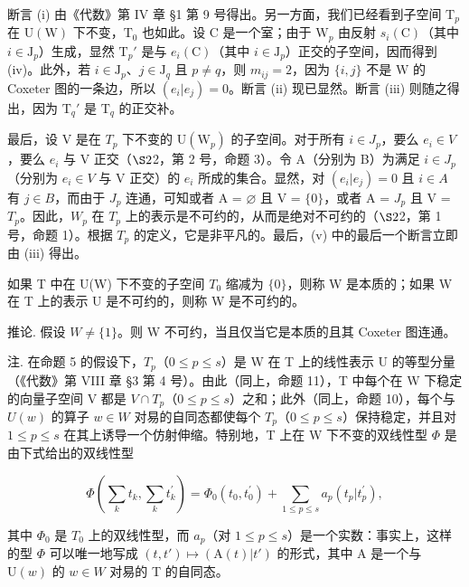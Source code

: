 断言 (i) 由《代数》第 IV 章 §1 第 9 号得出。另一方面，我们已经看到子空间 \(\mathrm{T}_p\) 在 \(\mathrm{U}(\mathrm{W})\) 下不变，\(\mathrm{T}_0\) 也如此。设 \(\mathrm{C}\) 是一个室；由于 \(\mathrm{W}_p\) 由反射 \(s_i(\mathrm{C})\)（其中 \(i \in \mathrm{J}_p\)）生成，显然 \(\mathrm{T}_p'\) 是与 \(e_i(\mathrm{C})\)（其中 \(i \in \mathrm{J}_p\)）正交的子空间，因而得到 (iv)。此外，若 \(i \in \mathrm{J}_p\)、\(j \in \mathrm{J}_q\) 且 \(p \neq q\)，则 \(m_{ij} = 2\)，因为 \(\{i,j\}\) 不是 \(\mathrm{W}\) 的 Coxeter 图的一条边，所以 \((e_i|e_j) = 0\)。断言 (ii) 现已显然。断言 (iii) 则随之得出，因为 \(\mathrm{T}_q'\) 是 \(\mathrm{T}_q\) 的正交补。

最后，设 V 是在 \(T_{p}\) 下不变的 \(\mathrm{U}(\mathrm{W}_{p})\) 的子空间。对于所有 \(i \in J_{p}\)，要么 \(e_{i} \in V\)，要么 \(e_{i}\) 与 V 正交（\(\S2\)2，第 2 号，命题 3）。令 A（分别为 B）为满足 \(i \in J_{p}\)（分别为 \(e_{i} \in V\) 与 V 正交）的 \(e_{i}\) 所成的集合。显然，对 \((e_{i}|e_{j}) = 0\) 且 \(i \in A\) 有 \(j \in B\)，而由于 \(J_{p}\) 连通，可知或者 A = \(\varnothing\) 且 V = \(\{0\}\)，或者 A = \(J_{p}\) 且 V = \(T_{p}\)。因此，\(W_{p}\) 在 \(T_{p}\) 上的表示是不可约的，从而是绝对不可约的（\(\S2\)2，第 1 号，命题 1）。根据 \(T_{p}\) 的定义，它是非平凡的。最后，(v) 中的最后一个断言立即由 (iii) 得出。

如果 T 中在 U(W) 下不变的子空间 \(T_{0}\) 缩减为 \(\{0\}\)，则称 W 是本质的；如果 W 在 T 上的表示 U 是不可约的，则称 W 是不可约的。

推论. 假设 \(W \neq \{1\}\)。则 W 不可约，当且仅当它是本质的且其 Coxeter 图连通。

注. 在命题 5 的假设下，\(T_{p}\)（\(0 \leqslant p \leqslant s\)）是 W 在 T 上的线性表示 U 的等型分量（《代数》第 VIII 章 §3 第 4 号）。由此（同上，命题 11），T 中每个在 W 下稳定的向量子空间 V 都是 \(V \cap T_{p}\)（\(0 \leqslant p \leqslant s\)）之和；此外（同上，命题 10），每个与 \(U(w)\) 的算子 \(w \in W\) 对易的自同态都使每个 \(T_{p}\)（\(0 \leqslant p \leqslant s\)）保持稳定，并且对 \(1 \leqslant p \leqslant s\) 在其上诱导一个仿射伸缩。特别地，T 上在 W 下不变的双线性型 \(\Phi\) 是由下式给出的双线性型

\[
\varPhi \left(\sum_ {k} t _ {k}, \sum_ {k} t _ {k} ^ {\prime}\right) = \varPhi_ {0} (t _ {0}, t _ {0} ^ {\prime}) + \sum_ {1 \leqslant p \leqslant s} a _ {p} (t _ {p} | t _ {p} ^ {\prime}),
\]

其中 \(\Phi_{0}\) 是 \(T_{0}\) 上的双线性型，而 \(a_{p}\)（对 \(1 \leqslant p \leqslant s\)）是一个实数：事实上，这样的型 \(\Phi\) 可以唯一地写成 \((t, t') \mapsto (\mathrm{A}(t)|t')\) 的形式，其中 A 是一个与 \(\mathrm{U}(w)\) 的 \(w \in W\) 对易的 T 的自同态。
